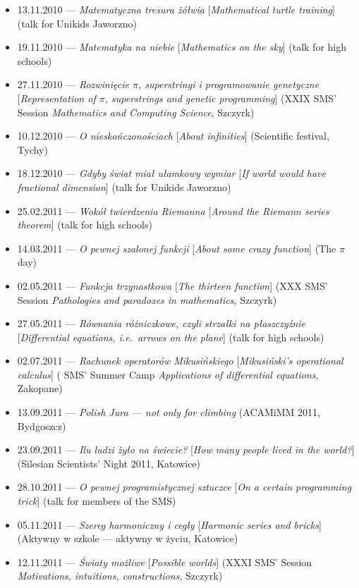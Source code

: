 \begin{itemize}
  \item 13.11.2010 --- \textsl{Matematyczna tresura żółwia} [\textsl{Mathematical turtle training}] (talk for Unikids Jaworzno)
  \item 19.11.2010 --- \textsl{Matematyka na niebie} [\textsl{Mathematics on the sky}] (talk for high schools)
  \item 27.11.2010 --- \textsl{Rozwinięcie $\pi$, superstringi i programowanie genetyczne} [\textsl{Representation of $\pi$, superstrings and genetic programming}] (XXIX SMS' Session \textsl{Mathematics and Computing Science}, Szczyrk)
  \item 10.12.2010 --- \textsl{O nieskończonościach} [\textsl{About infinities}] (Scientific festival, Tychy)
  \item 18.12.2010 --- \textsl{Gdyby świat miał ułamkowy wymiar} [\textsl{If world would have fractional dimension}] (talk for Unikids Jaworzno)
  \item 25.02.2011 --- \textsl{Wokół twierdzenia Riemanna} [\textsl{Around the Riemann series theorem}] (talk for high schools)
  \item 14.03.2011 --- \textsl{O pewnej szalonej funkcji} [\textsl{About some crazy function}] (The $\pi$ day)
  \item 02.05.2011 --- \textsl{Funkcja trzynastkowa} [\textsl{The thirteen function}] (XXX SMS' Session \textsl{Pathologies and paradoxes in mathematics}, Szczyrk)
  \item 27.05.2011 --- \textsl{Równania różniczkowe, czyli strzałki na płaszczyźnie} [\textsl{Differential equations, i.e.\ arrows on the plane}] (talk for high schools)
  \item 02.07.2011 --- \textsl{Rachunek operatorów Mikusińskiego} [\textsl{Mikusiński's operational calculus}] ( SMS' Summer Camp \textsl{Applications of differential equations}, Zakopane)
  \item 13.09.2011 --- \textsl{Polish Jura --- not only for climbing} (ACAMiMM 2011, Bydgoszcz)
  \item 23.09.2011 --- \textsl{Ilu ludzi żyło na świecie?} [\textsl{How many people lived in the world?}] (Silesian Scientists' Night 2011, Katowice)
  \item 28.10.2011 --- \textsl{O pewnej programistycznej sztuczce} [\textsl{On a certain programming trick}] (talk for members of the SMS)
  \item 05.11.2011 --- \textsl{Szereg harmoniczny i cegły} [\textsl{Harmonic series and bricks}] (Aktywny w szkole --- aktywny w życiu, Katowice)
  \item 12.11.2011 --- \textsl{Światy możliwe} [\textsl{Possible worlds}] (XXXI SMS' Session \textsl{Motivations, intuitions, constructions}, Szczyrk)

\end{itemize}
